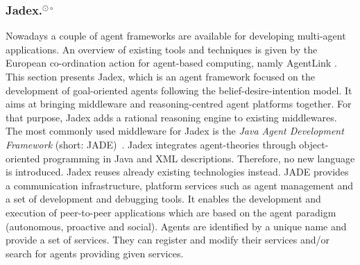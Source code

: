 \subsubsection[Jadex.]{Jadex.$^{\odot\circ}$}\label{fun:apl_jadex}
Nowadays a couple of agent frameworks are available for developing multi-agent applications. An overview of existing tools and techniques is given by the European co-ordination action for agent-based computing, namly AgentLink \cite{Mangina}. %
This section presents Jadex, which is an agent framework focused on the development of goal-oriented agents following the belief-desire-intention model.
It aims at bringing middleware and reasoning-centred agent platforms together.
For that purpose, Jadex adds a rational reasoning engine to existing middlewares.
The most commonly used middleware for Jadex is the \emph{Java Agent Development Framework} (short: JADE)~\cite{bellifemine_jade_2005}. %
Jadex integrates agent-theories through object-oriented programming in Java and XML descriptions.
Therefore, no new language is introduced.
Jadex reuses already existing technologies instead.
JADE provides a communication infrastructure, platform services such as agent management and a set of development and debugging tools.
It enables the development and execution of peer-to-peer applications which are based on the agent paradigm (autonomous, proactive and social). %
Agents are identified by a unique name and provide a set of services.
They can register and modify their services and/or search for agents providing given services.
